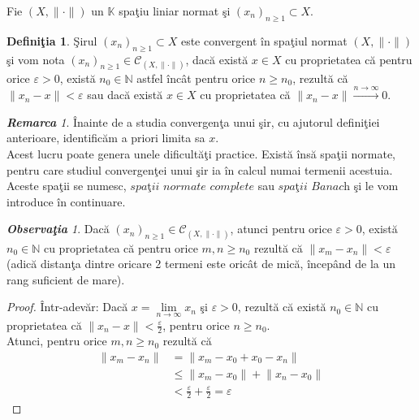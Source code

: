 \documentclass[ a4paper, 12pt]{report}
\theoremstyle{definition}
\newtheorem{definition}{\bf Defini\c tia}[section]
\theoremstyle{remark}
\newtheorem{remarc}{\bf Remarca}[section]
\newtheorem{obs}{\bf Observa\c tia }[section]
\numberwithin{equation}{section}
\begin{document}
Fie $(X, \lVert \cdot \rVert)$ un $\mathbb{K}$ spa\c tiu  liniar normat \c si $(x_n)_{n \geq 1} \subset X.$\\
\begin{definition}
\c Sirul $(x_n)_{n \geq 1} \subset X$ este convergent \^in spa\c tiul normat $(X, \lVert \cdot \rVert)$ \c si vom nota $(x_n)_{n \geq 1} \in \mathcal{C}_{(X, \lVert \cdot \rVert)}$,  dac\u a exist\u a $x \in X$  cu proprietatea c\u a pentru orice $\varepsilon>0$, exist\u a $ n_0 \in \mathbb{N}$ astfel \^inc\^at pentru orice $n \geq n_0$, rezult\u a c\u a $\lVert x_n - x \rVert < \varepsilon$ sau dac\u a exist\u a $x \in X$ cu proprietatea c\u a $\lVert x_n - x \rVert \stackrel{n \rightarrow \infty}{\longrightarrow } 0$.
\end{definition}
\begin{remarc}
\^Inainte de a studia convergen\c ta unui \c sir, cu ajutorul defini\c tiei anterioare, identific\u am  a priori limita sa $x$.\\
Acest lucru poate genera unele dificult\u a\c ti practice. Exist\u a \^ins\u a spa\c tii normate, pentru care studiul convergen\c tei unui \c sir ia \^in calcul numai termenii acestuia. Aceste spa\c tii se numesc,$\textit{ spa\c tii normate complete}$ sau $\textit{spa\c tii Banach}$ \c si le vom introduce \^in continuare.
\end{remarc}
\begin{obs}
Dac\u a $(x_n)_{n \geq 1} \in \mathcal{C}_{(X, \lVert \cdot \rVert)}$, atunci pentru orice $\varepsilon >0$, exist\u a $n_0 \in \mathbb{N}$ cu proprietatea c\u a pentru orice $m,n \geq n_0$ rezult\u a  c\u a $\lVert x_m - x_n \rVert < \varepsilon $ (adic\u a distan\c ta dintre oricare 2 termeni este oric\^at de mic\u a, \^incep\^and de la un rang suficient de mare).
\end{obs}
\begin{proof}
\^Intr-adev\u ar: Dac\u a  $x = \lim\limits_{n \rightarrow \infty} x_n$ \c si $\varepsilon>0$, rezult\u a c\u a exist\u a $n_0 \in \mathbb{N}$ cu proprietatea c\u a $\lVert x_n - x \rVert < \frac{\varepsilon}{2}$, pentru orice $n \geq n_0.$\\
Atunci, pentru orice $m,n \geq n_0$ rezult\u a c\u a
\begin{align*}
\lVert x_m - x_n \rVert
&=\lVert x_m - x_0+x_0-x_n \rVert\\ & \leq \lVert x_m - x_0 \rVert +  \lVert x_n - x_0 \rVert \\
&<\frac{\varepsilon}{2}+\frac{\varepsilon}{2} = \varepsilon
\end{align*}
\end{proof}
\end{document}
